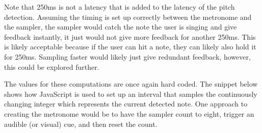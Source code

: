 Note that 250ms is not a latency that is added to the latency of the pitch detection. Assuming the timing is set up correctly between the metronome and the sampler, the sampler would catch the note the user is singing and give feedback instantly, it just would not give more feedback for another 250ms. This is likely acceptable because if the user can hit a note, they can likely also hold it for 250ms. Sampling faster would likely just give redundant feedback, however, this could be explored further. 

The values for these computations are once again hard coded. The snippet below shows how JavaScript is used to set up an interval that samples the continuously changing integer which represents the current detected note.  One approach to creating the metronome would be to have the sampler count to eight, trigger an audible (or visual) cue, and then reset the count.



